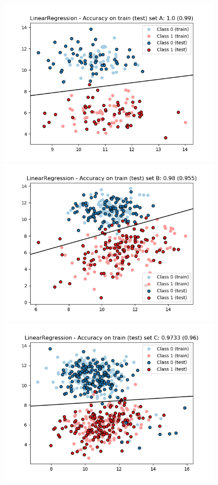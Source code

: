 \documentclass[a4paper, 11pt]{report}
\begin{document}
\begin{enumerate}[label=\alph*]
        \begin{figure}[!htb]
          \includegraphics[width=\linewidth]{./images/LinReg_A.png}
          \label{fig:linreg_a}
        \endminipage\hfill
          \includegraphics[width=\linewidth]{./images/LinReg_B.png}
          \label{fig:linreg_b}
        \endminipage\hfill
          \includegraphics[width=\linewidth]{./images/LinReg_C.png}

\end{figure}
\end{enumerate}
\end{document}
